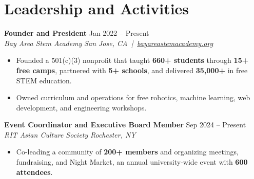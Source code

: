 \documentclass[10pt,letterpaper]{article}
\newif\ifresumeFirstRole
\newcommand{\resumeRole}[4]{%
  \ifresumeFirstRole
    \global\resumeFirstRolefalse
  \else
    \vspace{0pt plus 1fill}%
  \fi
  \textbf{#1} \hfill #2\\
  \textit{#3} \hfill \textit{#4}
}
\begin{document}
\section*{Leadership and Activities}
\resumeRole{Founder and President}{Jan 2022 -- Present}{Bay Area Stem Academy}{San Jose, CA \,|\, \href{https://bayareastemacademy.org}{bayareastemacademy.org}}
\begin{itemize}
  \item Founded a 501(c)(3) nonprofit that taught \textbf{660+ students} through \textbf{15+ free camps}, partnered with \textbf{5+ schools}, and delivered \textbf{\textdollar{}35,000+} in free STEM education.
  \item Owned curriculum and operations for free robotics, machine learning, web development, and engineering workshops.
\end{itemize}

\resumeRole{Event Coordinator and Executive Board Member}{Sep 2024 -- Present}{RIT Asian Culture Society}{Rochester, NY}
\begin{itemize}
  \item Co-leading a community of \textbf{200+ members} and organizing meetings, fundraising, and Night Market, an annual university-wide event with \textbf{600 attendees}.
\end{itemize}
\end{document}
